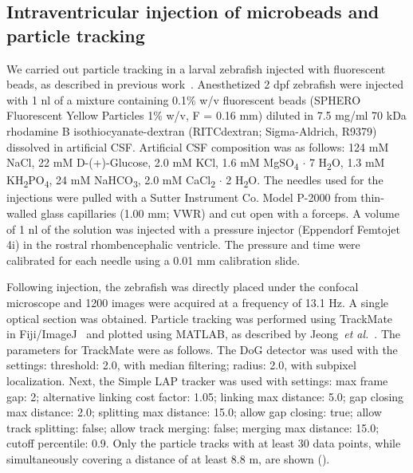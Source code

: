 \documentclass{WileyMSP-template}
\begin{document}
\subsection{Intraventricular injection of microbeads and particle tracking}
We carried out particle tracking in a larval zebrafish injected with fluorescent beads,
as described in previous work~\cite{Olstad2019CiliaryDevelopment}.
Anesthetized 2 dpf zebrafish were injected with 1 nl of a mixture containing 0.1\% w/v fluorescent beads
(SPHERO Fluorescent Yellow Particles 1\% w/v, F = 0.16 mm) diluted
in 7.5 mg/ml 70 kDa rhodamine B isothiocyanate-dextran (RITCdextran; Sigma-Aldrich, R9379)
dissolved in artificial CSF. Artificial CSF composition was as follows:
124 mM NaCl, 22 mM D-(+)-Glucose, 2.0 mM KCl, 1.6 mM MgSO\textsubscript{4} $\cdot$ 7 H\textsubscript{2}O,
1.3 mM KH\textsubscript{2}PO\textsubscript{4}, 24 mM NaHCO\textsubscript{3},
2.0 mM CaCl\textsubscript{2} $\cdot$ 2 H\textsubscript{2}O.
The needles used for the injections were pulled with a
Sutter Instrument Co. Model P-2000 from thin-walled glass
capillaries (1.00 mm; VWR) and cut open with a forceps.
A volume of 1 nl of the solution was injected with a pressure injector
(Eppendorf Femtojet 4i) in the rostral rhombencephalic ventricle.
The pressure and time were calibrated for each needle using a 0.01 mm calibration slide.

Following injection, the zebrafish was directly placed under the confocal
microscope and 1200 images were acquired at a frequency of 13.1 Hz.
A single optical section was obtained. Particle tracking was performed using
TrackMate~\cite{Tinevez2017TrackMate:Tracking} in Fiji/ImageJ~\cite{Schindelin2012Fiji:Analysis}
and plotted using MATLAB, as described by Jeong~\emph{et al.}~\cite{Jeong2022MeasurementTelencephalon}.
The parameters for TrackMate were as follows.
The DoG detector was used with the settings: threshold: 2.0, with
median filtering; radius: 2.0, with subpixel localization.
Next, the Simple LAP tracker was used with settings: max frame gap: 2;
alternative linking cost factor: 1.05; linking max distance: 5.0; gap closing max distance: 2.0;
splitting max distance: 15.0; allow gap closing: true; allow track splitting:
false; allow track merging: false; merging max distance: 15.0; cutoff percentile: 0.9.
Only the particle tracks with at least 30 data points, while simultaneously
covering a distance of at least 8.8 \textmu m, are shown ().
\end{document}

